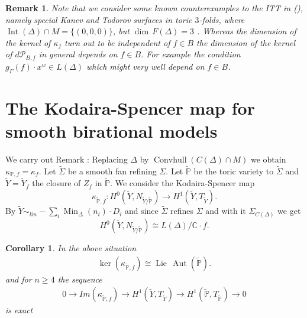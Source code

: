 \documentclass[12pt, english]{article}
\newtheorem{remark}[definition]{Remark}
\newtheorem{corollar}[definition]{Corollary}
\DeclareMathOperator{\Lie}{Lie}
\DeclareMathOperator{\Aut}{Aut}
\DeclareMathOperator{\Int}{Int}
\DeclareMathOperator{\Min}{Min}
\DeclareMathOperator{\Convhull}{Convhull}
\begin{document}
	\begin{remark}
		\normalfont
	Note that we consider some known counterexamples to the ITT in (\cite{Gie23}), namely special Kanev and Todorov surfaces in toric $3$-folds, where $\Int(\Delta) \cap M = \{(0,0,0)\}$, but $\dim \, F(\Delta) = 3$ . Whereas the dimension of the kernel of $\kappa_f$ turn out to be independent of $f \in B$ the dimension of the kernel of $d \mathcal{P}_{B,f}$ in general depends on $f \in B$. For example the condition $g_{\Gamma}(f) \cdot x^w \in L(\Delta)$ which might very well depend on $f \in B$. 
	\end{remark}






\section{The Kodaira-Spencer map for smooth birational models} \label{section_Kod_Sp_map_smooth_bir_model}

We carry out Remark \cite[rem.9.4]{Gie22}: Replacing $\Delta$ by $\Convhull(C(\Delta) \cap M)$ we obtain $\kappa_{\mathbb{P},f} = \kappa_f$. Let $\tilde{\Sigma}$ be a smooth fan refining $\Sigma$. Let $\tilde{\mathbb{P}}$ be the toric variety to $\tilde{\Sigma}$ and $\tilde{Y} = \tilde{Y}_f$ the closure of $Z_f$ in $\tilde{\mathbb{P}}$. We %
consider the Kodaira-Spencer map
\[ \kappa_{\tilde{\mathbb{P}},f}: H^0(\tilde{Y}, N_{\tilde{Y} / \tilde{\mathbb{P}}}) \rightarrow H^1(\tilde{Y}, T_{\tilde{Y}}).  \] 
By \cite[Prop.7.1]{Bat22} $\tilde{Y} \sim_{lin} - \sum\limits_{i} \Min_{\Delta}(n_{i}) \cdot D_i$ and since $\tilde{\Sigma}$ refines $\Sigma$ and with it $\Sigma_{C(\Delta)}$ we get 
\[ H^0(\tilde{Y}, N_{\tilde{Y} / \tilde{\mathbb{P}}}) \cong L(\Delta)/ \mathbb{C} \cdot f.  \]
\begin{corollar} \label{corollary_ker_Kod_Sp_smooth_case}
	In the above situation
	\begin{align*}
		\ker(\kappa_{\tilde{\mathbb{P}},f}) \cong \Lie \, \Aut(\tilde{\mathbb{P}}).
	\end{align*}
	and for $n \geq 4$ the sequence
	\begin{align*}
		0 \rightarrow Im(\kappa_{\tilde{\mathbb{P}},f}) \rightarrow H^1(\tilde{Y}, T_{\tilde{Y}}) \rightarrow H^1(\tilde{\mathbb{P}}, T_{\tilde{\mathbb{P}}}) \rightarrow 0
	\end{align*}
	is exact
\end{corollar}
\end{document}
